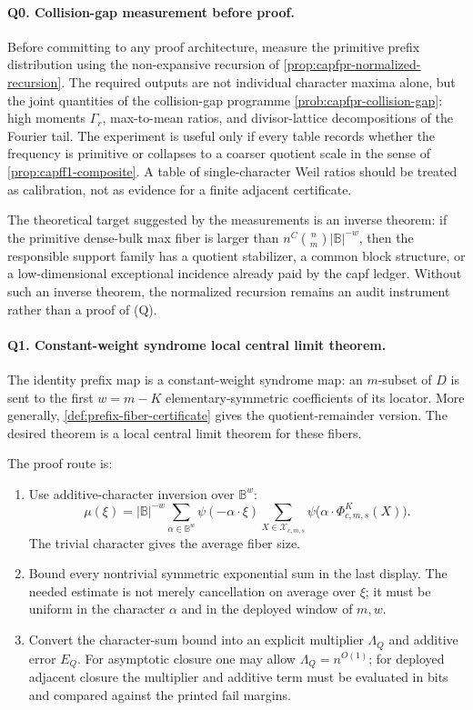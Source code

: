 \documentclass[11pt]{article}
\theoremstyle{definition}
\theoremstyle{remark}
\newcommand{\B}{\mathbb{B}}
\begin{document}
\paragraph{Q0. Collision-gap measurement before proof.}
Before committing to any proof architecture, measure the primitive prefix distribution using the non-expansive recursion of \cref{prop:capfpr-normalized-recursion}.  The required outputs are not individual character maxima alone, but the joint quantities of the collision-gap programme \cref{prob:capfpr-collision-gap}: high moments $\Gamma_r$, max-to-mean ratios, and divisor-lattice decompositions of the Fourier tail.  The experiment is useful only if every table records whether the frequency is primitive or collapses to a coarser quotient scale in the sense of \cref{prop:capff1-composite}.  A table of single-character Weil ratios should be treated as calibration, not as evidence for a finite adjacent certificate.

The theoretical target suggested by the measurements is an inverse theorem: if the primitive dense-bulk max fiber is larger than $n^C\binom nm|\B|^{-w}$, then the responsible support family has a quotient stabilizer, a common block structure, or a low-dimensional exceptional incidence already paid by the capf ledger.  Without such an inverse theorem, the normalized recursion remains an audit instrument rather than a proof of \textup{(Q)}.

\paragraph{Q1. Constant-weight syndrome local central limit theorem.}
The identity prefix map is a constant-weight syndrome map: an $m$-subset of $D$ is sent to the first $w=m-K$ elementary-symmetric coefficients of its locator.  More generally, \cref{def:prefix-fiber-certificate} gives the quotient-remainder version.  The desired theorem is a local central limit theorem for these fibers.

The proof route is:
\begin{enumerate}[label=\textup{Q1.\arabic*},leftmargin=3.0em]
\item Use additive-character inversion over $\B^w$:
\[
        \mu(\xi)
        = |\B|^{-w}\sum_{\alpha\in\B^w}\psi(-\alpha\cdot\xi)
          \sum_{X\in\mathcal X_{c,m,s}}
          \psi\bigl(\alpha\cdot\Phi_{c,m,s}^{K}(X)\bigr).
\]
The trivial character gives the average fiber size.
\item Bound every nontrivial symmetric exponential sum in the last display.  The needed estimate is not merely cancellation on average over $\xi$; it must be uniform in the character $\alpha$ and in the deployed window of $m,w$.
\item Convert the character-sum bound into an explicit multiplier $\Lambda_Q$ and additive error $E_Q$.  For asymptotic closure one may allow $\Lambda_Q=n^{O(1)}$; for deployed adjacent closure the multiplier and additive term must be evaluated in bits and compared against the printed fail margins.
\end{enumerate}
\end{document}
